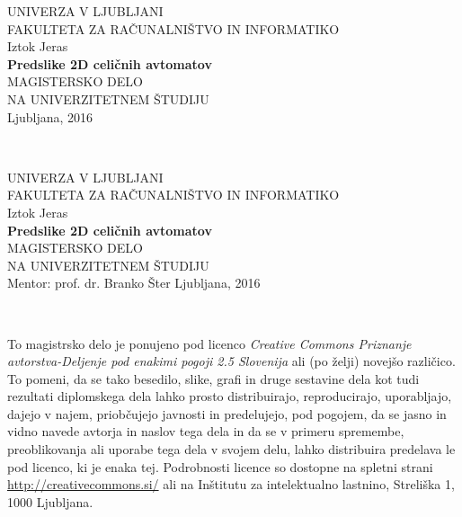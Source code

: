 \documentclass[12pt,a4paper,openany,twoside]{book}
\begin{document}
\thispagestyle{empty} 
\begin{center}
             {\large UNIVERZA V LJUBLJANI\\
                     FAKULTETA ZA RAČUNALNIŠTVO IN INFORMATIKO\\}
\vspace{3cm} {\large Iztok Jeras}\\
\vspace{2cm} {\large \textbf{Predslike 2D celičnih avtomatov}}\\
\vspace{2cm} {MAGISTERSKO DELO\\ NA UNIVERZITETNEM ŠTUDIJU}\\
\vfill       {\Large Ljubljana, 2016}
\end{center}
\newpage
\ \thispagestyle{empty}
\newpage

\thispagestyle{empty} 
\begin{center}
             {\large UNIVERZA V LJUBLJANI\\
                     FAKULTETA ZA RAČUNALNIŠTVO IN INFORMATIKO\\}
\vspace{3cm} {\large Iztok Jeras}\\
\vspace{2cm} {\large \textbf{Predslike 2D celičnih avtomatov}}\\
\vspace{2cm} {MAGISTERSKO DELO\\ NA UNIVERZITETNEM ŠTUDIJU}\\
\vspace{2cm} {\Large Mentor: prof. dr. Branko Šter}
\vfill       {\Large Ljubljana, 2016}
\end{center}
\newpage
\ \thispagestyle{empty}
\newpage

\thispagestyle{empty}

\vspace*{5cm}
{\small \noindent
To magistrsko delo je ponujeno pod licenco \textit{Creative Commons Priznanje avtorstva-Deljenje pod enakimi pogoji 2.5 Slovenija}
ali (po želji) novejšo različico.
To pomeni, da se tako besedilo, slike, grafi in druge sestavine dela kot tudi rezultati diplomskega dela lahko prosto distribuirajo,
reproducirajo, uporabljajo, dajejo v najem, priobčujejo javnosti in predelujejo, pod pogojem, da se jasno in vidno navede avtorja in naslov tega
dela in da se v primeru spremembe, preoblikovanja ali uporabe tega dela v svojem delu, lahko distribuira predelava le pod
licenco, ki je enaka tej.
Podrobnosti licence so dostopne na spletni strani \url{http://creativecommons.si/} ali na Inštitutu za
intelektualno lastnino, Streliška 1, 1000 Ljubljana.

\begin{center}%
  \hspace*{1ex}
\end{center}
}
\end{document}
